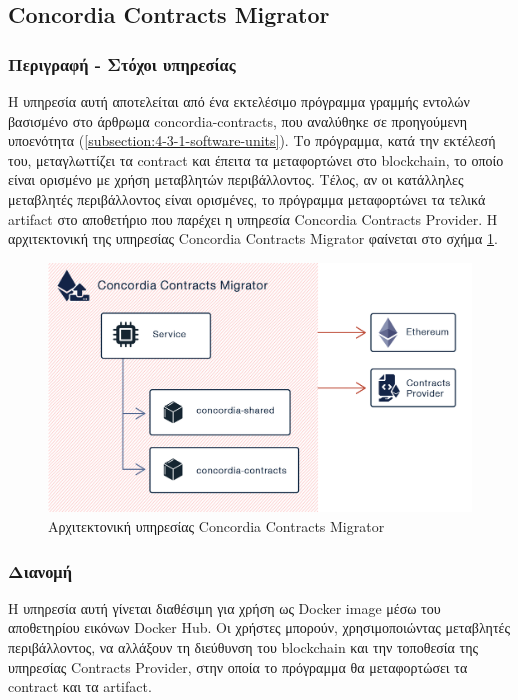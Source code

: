 \subsection{Concordia Contracts Migrator} \label{subsection:4-3-3-concordia-contracts-migrator}

\subsubsection{Περιγραφή - Στόχοι υπηρεσίας}

Η υπηρεσία αυτή αποτελείται από ένα εκτελέσιμο πρόγραμμα γραμμής εντολών βασισμένο στο άρθρωμα concordia-contracts, που αναλύθηκε σε προηγούμενη υποενότητα (\ref{subsection:4-3-1-software-units}). Το πρόγραμμα, κατά την εκτέλεσή του, μεταγλωττίζει τα contract και έπειτα τα μεταφορτώνει στο blockchain, το οποίο είναι ορισμένο με χρήση μεταβλητών περιβάλλοντος. Τέλος, αν οι κατάλληλες μεταβλητές περιβάλλοντος είναι ορισμένες, το πρόγραμμα μεταφορτώνει τα τελικά artifact στο αποθετήριο που παρέχει η υπηρεσία Concordia Contracts Provider. Η αρχιτεκτονική της υπηρεσίας Concordia Contracts Migrator φαίνεται στο σχήμα \ref{figure:4-3-concordia-contracts-migrator-architecture}.

\vspace{.5\baselineskip}

\begin{figure}[H]
    \centering
    \includegraphics[width=.75\textwidth]{assets/figures/chapter-4/4.3.architecture-4.3.3.concordia-contracts-migrator-architecture.png}
    \caption{Αρχιτεκτονική υπηρεσίας Concordia Contracts Migrator}
    \label{figure:4-3-concordia-contracts-migrator-architecture}
\end{figure}

\subsubsection{Διανομή}

Η υπηρεσία αυτή γίνεται διαθέσιμη για χρήση ως Docker image μέσω του αποθετηρίου εικόνων Docker Hub. Οι χρήστες μπορούν, χρησιμοποιώντας μεταβλητές περιβάλλοντος, να αλλάξουν τη διεύθυνση του blockchain και την τοποθεσία της υπηρεσίας Contracts Provider, στην οποία το πρόγραμμα θα μεταφορτώσει τα contract και τα artifact.